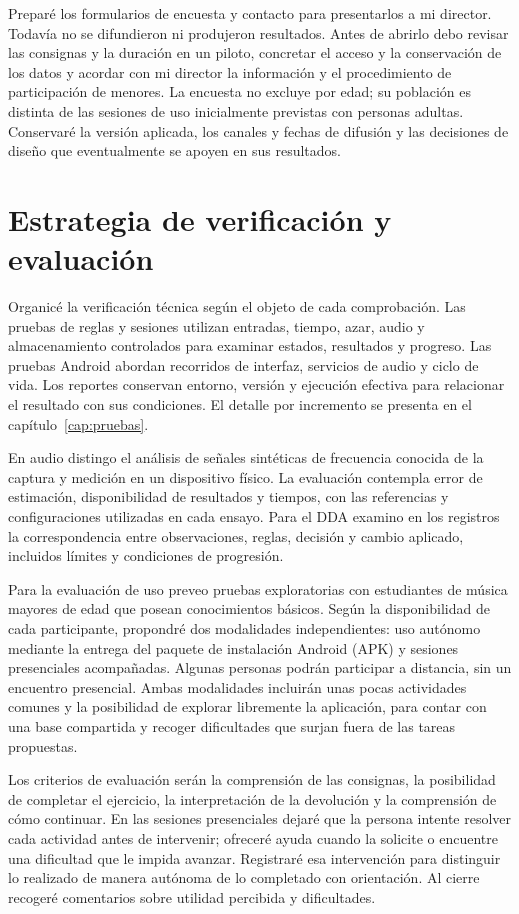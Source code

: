 Preparé los formularios de encuesta y contacto para presentarlos a mi director.
Todavía no se difundieron ni produjeron resultados.
Antes de abrirlo debo revisar las consignas y la duración en un piloto, concretar
el acceso y la conservación de los datos y acordar con mi director la información
y el procedimiento de participación de menores. La encuesta no excluye por edad;
su población es distinta de las sesiones de uso inicialmente previstas con
personas adultas. Conservaré la versión aplicada, los canales y fechas de difusión
y las decisiones de diseño que eventualmente se apoyen en sus resultados.

\section{Estrategia de verificación y evaluación}
\label{sec:metodo-evaluacion}
Organicé la verificación técnica según el objeto de cada comprobación. Las pruebas
de reglas y sesiones utilizan entradas, tiempo, azar, audio y almacenamiento
controlados para examinar estados, resultados y progreso. Las pruebas Android
abordan recorridos de interfaz, servicios de audio y ciclo de vida. Los reportes
conservan entorno, versión y ejecución efectiva para relacionar el resultado
con sus condiciones. El detalle por incremento se presenta en el
capítulo~\ref{cap:pruebas}.

En audio distingo el análisis de señales sintéticas de frecuencia conocida de
la captura y medición en un dispositivo físico. La evaluación contempla error
de estimación, disponibilidad de resultados y tiempos, con las referencias y
configuraciones utilizadas en cada ensayo. Para el DDA examino en los registros
la correspondencia entre observaciones, reglas, decisión y cambio aplicado,
incluidos límites y condiciones de progresión.

Para la evaluación de uso preveo pruebas exploratorias con estudiantes de música
mayores de edad que posean conocimientos básicos. Según la disponibilidad de
cada participante, propondré dos modalidades independientes: uso autónomo mediante
la entrega del paquete de instalación Android (APK) y sesiones presenciales
acompañadas. Algunas personas podrán participar a distancia, sin un encuentro
presencial. Ambas modalidades incluirán unas pocas actividades comunes y la
posibilidad de explorar libremente la aplicación, para contar con una base
compartida y recoger dificultades que surjan fuera de las tareas propuestas.

Los criterios de evaluación serán la comprensión de las consignas, la posibilidad
de completar el ejercicio, la interpretación de la devolución y la comprensión
de cómo continuar. En las sesiones presenciales dejaré que la persona intente
resolver cada actividad antes de intervenir; ofreceré ayuda cuando la solicite
o encuentre una dificultad que le impida avanzar. Registraré esa intervención
para distinguir lo realizado de manera autónoma de lo completado con orientación.
Al cierre recogeré comentarios sobre utilidad percibida y dificultades.


